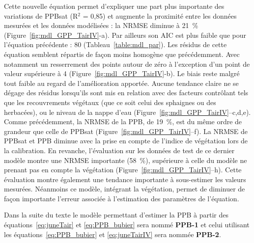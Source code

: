 Cette nouvelle équation permet d'expliquer une part plus importante des variations de PPBsat (R$^{2}$ = 0,85) et augmente la proximité entre les données mesurées et les données modélisées : la NRMSE diminue à \SI{21}{\percent} (Figure~\ref{fig:mdl_GPP_TairIV}-a).
Par ailleurs son AIC est plus faible que pour l'équation précédente : 80 (Tableau~\ref{table:mdl_par}).
Les résidus de cette équation semblent répartis de façon moins homogène que précédemment.
Avec notamment un resserrement des points autour de zéro à l'exception d'un point de valeur supérieure à \num{4} (Figure~\ref{fig:mdl_GPP_TairIV}-b).
Le biais reste malgré tout faible au regard de l'amélioration apportée.
Aucune tendance claire ne se dégage des résidus lorsqu'ils sont mis en relation avec des facteurs contrôlant tels que les recouvrements végétaux (que ce soit celui des sphaignes ou des herbacées), ou le niveau de la nappe d'eau (Figure~\ref{fig:mdl_GPP_TairIV}--c,d,e).
Comme précédemment, la NRMSE de la PPB, de \SI{19}{\percent}, est du même ordre de grandeur que celle de PPBsat (Figure~\ref{fig:mdl_GPP_TairIV}--f).
La NRMSE de PPBsat et PPB diminue avec la prise en compte de l'indice de végétation lors de la calibration.
En revanche, l'évaluation sur les données de test de ce dernier modèle montre une NRMSE importante (\SI{58}{\percent}), supérieure à celle du modèle ne prenant pas en compte la végétation (Figure~\ref{fig:mdl_GPP_TairIV}--h).
Cette évaluation montre également une tendance importante à sous-estimer les valeurs mesurées.
Néanmoins ce modèle, intégrant la végétation, permet de diminuer de façon importante l'erreur associée à l'estimation des paramètres de l'équation.

Dans la suite du texte le modèle permettant d'estimer la PPB à partir des équations~\ref{eq:juneTair} et \ref{eq:PPB_bubier} sera nommé \textbf{PPB-1} et celui utilisant les équations~\ref{eq:PPB_bubier} et \ref{eq:juneTairIV} sera nommée \textbf{PPB-2}.


